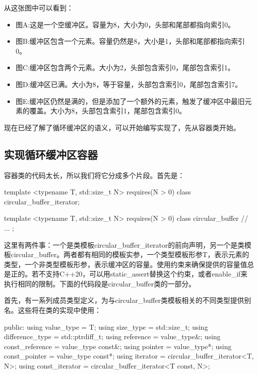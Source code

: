 从这张图中可以看到：

\begin{itemize}
  \item 图A:这是一个空缓冲区。容量为8，大小为0，头部和尾部都指向索引0。
  \item 图B:缓冲区包含一个元素。容量仍然是8，大小是1，头部和尾部都指向索引0。
  \item 图C:缓冲区包含两个元素。大小为2，头部包含索引0，尾部包含索引1。
  \item 图D:缓冲区已满。大小为8，等于容量，头部包含索引0，尾部包含索引7。
  \item 图E:缓冲区仍然是满的，但是添加了一个额外的元素，触发了缓冲区中最旧元素的覆盖。大小为8，头部包含索引1，尾部包含索引0。
\end{itemize}

现在已经了解了循环缓冲区的语义，可以开始编写实现了，先从容器类开始。

\subsection{实现循环缓冲区容器}

容器类的代码太长，所以我们将它分成多个片段。首先是：

\begin{cppcode}
template <typename T, std::size_t N>
	requires(N > 0)
class circular_buffer_iterator;

template <typename T, std::size_t N>
	requires(N > 0)
class circular_buffer
{
	// ...
};
\end{cppcode}

这里有两件事：一个是类模板circular_buffer_iterator的前向声明，另一个是类模板circular_buffer。两者都有相同的模板实参，一个类型模板形参T，表示元素的类型，一个非类型模板形参，表示缓冲区的容量。使用约束来确保提供的容量值总是正的。若不支持C++20，可以用static_assert替换这个约束，或者enable_if来执行相同的限制。下面的代码段是circular_buffer类的一部分。

首先，有一系列成员类型定义，为与circular_buffer类模板相关的不同类型提供别名。这些将在类的实现中使用：

\begin{cppcode}
	public:
	using value_type = T;
	using size_type = std::size_t;
	using difference_type = std::ptrdiff_t;
	using reference = value_type&;
	using const_reference = value_type const&;
	using pointer = value_type*;
	using const_pointer = value_type const*;
	using iterator = circular_buffer_iterator<T, N>;
	using const_iterator =
	circular_buffer_iterator<T const, N>;
\end{cppcode}

